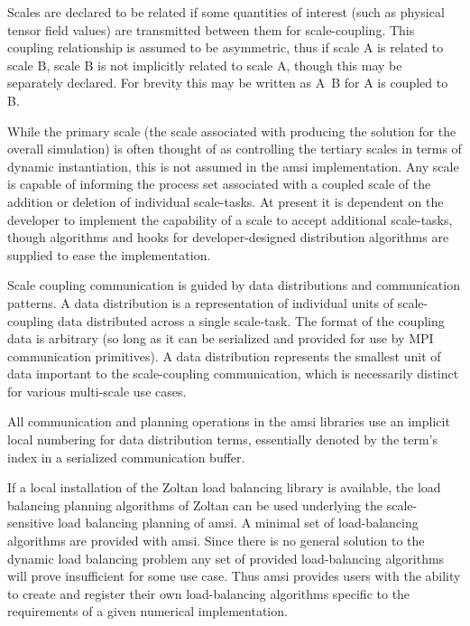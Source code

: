 \documentclass[11pt]{siamltex1213}
\begin{document}
Scales are declared to be related if some quantities of interest (such as physical tensor field values) are transmitted between them for scale-coupling. This coupling relationship is assumed to be asymmetric, thus if scale A is related to scale B, scale B is not implicitly related to scale A, though this may be separately declared. For brevity this may be written as A~B for A is coupled to B.

While the primary scale (the scale associated with producing the solution for the overall simulation) is often thought of as controlling the tertiary scales in terms of dynamic instantiation, this is not assumed in the amsi implementation. Any scale is capable of informing the process set associated with a coupled scale of the addition or deletion of individual scale-tasks. At present it is dependent on the developer to implement the capability of a scale to accept additional scale-tasks, though algorithms and hooks for developer-designed distribution algorithms are supplied to ease the implementation.

\label{amsi_communication}
Scale coupling communication is guided by data distributions and communication patterns. A data distribution is a representation of individual units of scale-coupling data distributed across a single scale-task. The format of the coupling data is arbitrary (so long as it can be serialized and provided for use by MPI communication primitives). A data distribution represents the smallest unit of data important to the scale-coupling communication, which is necessarily distinct for various multi-scale use cases. 

All communication and planning operations in the amsi libraries use an implicit local numbering for data distribution terms, essentially denoted by the term's index in a serialized communication buffer.

\label{amsi_load_balancing}
If a local installation of the Zoltan \cite{ZoltanOverviewArticle2002} \cite{ZoltanIsorropiaOverview2012} load balancing library is available, the load balancing planning algorithms of Zoltan can be used underlying the scale-sensitive load balancing planning of amsi. A minimal set of load-balancing algorithms are provided with amsi. Since there is no general solution to the dynamic load balancing problem any set of provided load-balancing algorithms will prove insufficient for some use case. Thus amsi provides users with the ability to create and register their own load-balancing algorithms specific to the requirements of a given numerical implementation.
\end{document}
